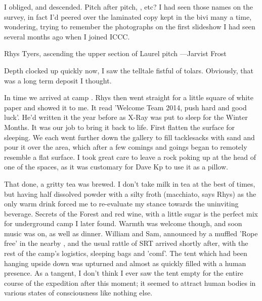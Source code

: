 I obliged, and descended. Pitch after pitch, ,  etc? I had seen those names on the survey, in fact I'd peered over the laminated copy kept in the bivi many a time, wondering, trying to remember the photographs on the first slideshow I had seen several months ago when I joined ICCC.


\begin{marginfigure}
\checkoddpage \ifoddpage \forcerectofloat \else \forceversofloat \fi
\centering
 \caption{Rhys Tyers, ascending the upper section of Laurel pitch ---Jarvist Frost}
 \label{Laurel-up}
\end{marginfigure}
Depth clocked up quickly now, I saw the telltale fistful of tolars. Obviously, that was a long term deposit I thought. 

In time we arrived at camp . Rhys then went straight for a little square of white paper and showed it to me. It read 'Welcome Team 2014, push hard and good luck'. He'd written it the year before as X-Ray was put to sleep for the Winter Months. It was our job to bring it back to life. First flatten the surface for sleeping. We each went  further down the gallery to fill tacklesacks with sand and pour it over the area, which after a few comings and goings began to remotely resemble a flat surface. I took great care to leave a rock poking up at the head of one of the spaces, as it was customary for Dave Kp to use it as a pillow. 

That done, a gritty tea was brewed. I don't take milk in tea at the best of times, but having half dissolved powder with a silty froth (macchiato, says Rhys) as the only warm drink forced me to re-evaluate my stance towards the uninviting beverage. Secrets of the Forest and red wine, with a little sugar is the perfect mix for underground camp I later found. Warmth was welcome though, and soon music was on, as well as dinner. William and Sam, announced by a muffled 'Rope free' in the nearby , and the usual rattle of SRT arrived shortly after, with the rest of the camp's logistics, sleeping bags and 'comf'. The tent which had been hanging upside down was upturned and almost as quickly filled with a human presence. As a tangent, I don't think I ever saw the tent empty for the entire course of the expedition after this moment; it seemed to attract human bodies in various states of consciousness like nothing else.

